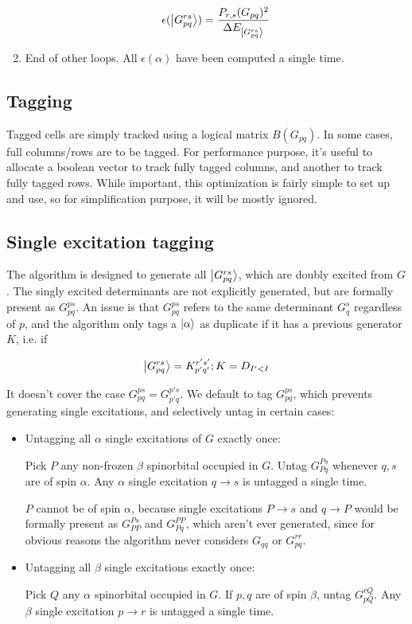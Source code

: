 \documentclass[./thesis.tex]{subfiles}
\begin{document}
\begin{enumerate}
\begin{equation}
\epsilon(\ket {G_{pq}^{rs}}) = \frac{P_{r,s}(G_{pq})^2}{\Delta E_{\ket {G^{rs}_{pq}}}}
\end{equation}
\item
End of other loops. All $\epsilon(\alpha)$ have been computed a single time.

\end{enumerate}


\subsection{Tagging}

Tagged cells are simply tracked using a logical matrix $B(G_{pq})$.
In some cases, full columns/rows are to be tagged. For performance purpose, it's useful to allocate a boolean vector to track fully tagged columns, and another to track fully tagged rows. While important, this optimization is fairly simple to set up and use, so for simplification purpose, it will be mostly ignored.


\subsection{Single excitation tagging}
\label{single_tagging}
The algorithm is designed to generate all $\ket {G_{pq}^{rs}}$, which are doubly excited from $G$. The singly excited determinants are not explicitly generated, but are formally present as $G_{pq}^{ps}$.
An issue is that $G_{pq}^{ps}$ refers to the same determinant $G_q^s$ regardless of $p$, and the algorithm only tags a $\ket \alpha$ as duplicate if it has a previous generator $K$, i.e. if

\begin{equation}
\ket {G_{pq}^{rs}} = {K}_{p'q'}^{r's'} ; K = D_{I'<I}
\end{equation}

It doesn't cover the case $G_{pq}^{ps} = G_{p'q}^{p's}$.
We default to tag $G_{pq}^{ps}$, which prevents generating single excitations, and selectively untag in certain cases:


\begin{itemize}
\item
Untagging all $\alpha$ single excitations of $G$ exactly once:

Pick $P$ any non-frozen $\beta$ spinorbital occupied in $G$. Untag $G_{Pq}^{Ps}$ whenever $q,s$ are of spin $\alpha$. Any $\alpha$ single excitation $q \rightarrow  s$ is untagged a single time.

$P$ cannot be of spin $\alpha$, because single excitations $P \rightarrow  s$ and $q \rightarrow  P$ would be formally present as $G_{PP}^{Ps}$ and $G_{Pq}^{PP}$, which aren't ever generated, since for obvious reasons the algorithm never considers $G_{qq}$ or $G_{pq}^{rr}$.
\item
Untagging all $\beta$ single excitations exactly once:

Pick $Q$ any $\alpha$ spinorbital occupied in $G$. If $p,q$ are of spin $\beta$, untag $G_{pQ}^{rQ}$. Any $\beta$ single excitation $p \rightarrow  r$ is untagged a single time.
\end{itemize}
\end{document}
